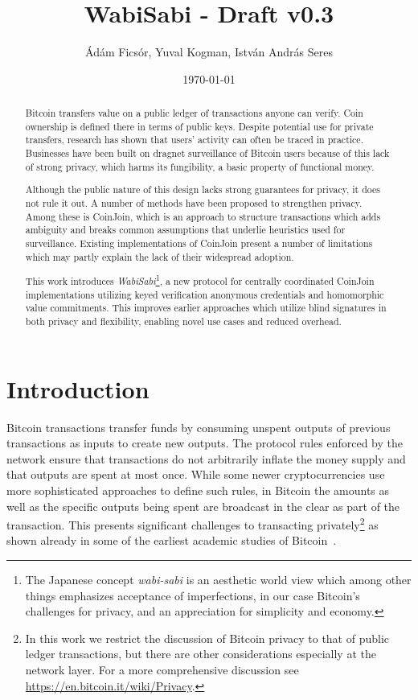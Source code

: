 \documentclass[a4paper]{article}
\title{WabiSabi - Draft v0.3}
\author{Ádám Ficsór, Yuval Kogman, István András Seres}
\date{\today}
\begin{document}
\maketitle

\begin{abstract}
Bitcoin transfers value on a public ledger of transactions anyone can verify. Coin ownership is defined there in terms of public keys.
Despite potential use for private transfers, research has shown that users' activity can often be traced in practice. Businesses have been built on dragnet surveillance of Bitcoin users because of this lack of strong privacy, which harms its fungibility, a basic property of functional money.

Although the public nature of this design lacks strong guarantees for privacy, it does not rule it out.
A number of methods have been proposed to strengthen privacy. Among these is CoinJoin, which is an approach to structure transactions which adds ambiguity and breaks common assumptions that underlie heuristics used for surveillance.
Existing implementations of CoinJoin present a number of limitations which may partly explain the lack of their widespread adoption.

This work introduces \emph{WabiSabi}\footnote{The Japanese concept \emph{wabi-sabi} is an aesthetic world view which among other things emphasizes acceptance of imperfections, in our case Bitcoin's challenges for privacy, and an appreciation for simplicity and economy.}, a new protocol for centrally coordinated CoinJoin implementations utilizing keyed verification anonymous credentials and homomorphic value commitments. This improves earlier approaches which utilize blind signatures in both privacy and flexibility, enabling novel use cases and reduced overhead.
\end{abstract}

\section{Introduction}

Bitcoin transactions transfer funds by consuming unspent outputs of previous transactions as inputs to create new outputs. The protocol rules enforced by the network ensure that transactions do not arbitrarily inflate the money supply and that outputs are spent at most once. While some newer cryptocurrencies use more sophisticated approaches to define such rules, in Bitcoin the amounts as well as the specific outputs being spent are broadcast in the clear as part of the transaction. This presents significant challenges to transacting privately\footnote{In this work we restrict the discussion of Bitcoin privacy to that of public ledger transactions, but there are other considerations especially at the network layer. For a more comprehensive discussion see \url{https://en.bitcoin.it/wiki/Privacy}.} as shown already in some of the earliest academic studies of Bitcoin~\cite{reid2013analysis,ron2013quantitative,androulaki2013evaluating,ober2013structure,moeser2013inquiry,meiklejohn2013fistful}.
\end{document}
